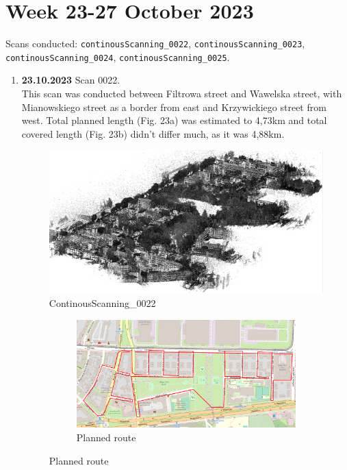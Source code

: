 \documentclass[a4paper,12pt]{book}
\begin{document}
\section{Week 23-27 October 2023}
Scans conducted: \verb|continousScanning_0022|, \verb|continousScanning_0023|, \verb|continousScanning_0024|, \verb|continousScanning_0025|.\\
\begin{enumerate}
	\item \textbf{23.10.2023} Scan 0022. \\
	This scan was conducted between Filtrowa street and Wawelska street, with Mianowskiego street as a border from east and Krzywickiego street from west. Total planned length (Fig. 23a) was estimated to 4,73km and total covered length (Fig. 23b) didn't differ much, as it was 4,88km.
	\begin{figure}[H]
		\includegraphics[width=1\linewidth]{cloud22}
		\caption{ContinousScanning\_0022}
	\end{figure}
	\pagebreak
	\begin{figure}[H]
		\centering
		\begin{subfigure}{.90\textwidth}
			\centering
			\includegraphics[width=1\linewidth]{route_p22}
			\caption{Planned route}
			\label{fig:a22}

\end{subfigure}
\end{figure}
\end{enumerate}
\end{document}
